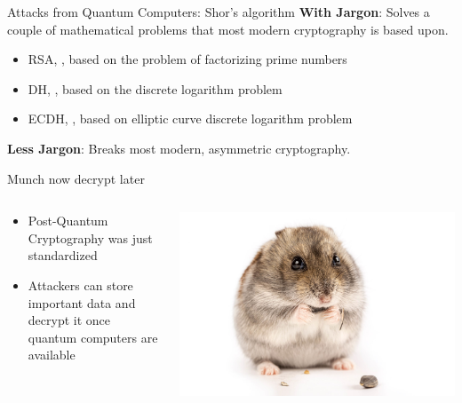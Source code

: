 \begin{frame}{Attacks from Quantum Computers: Shor's algorithm}
  \textbf{With Jargon}: Solves a couple of mathematical problems that most modern cryptography is based upon.
  \vfill
  \begin{itemize}
      \item RSA, , based on the problem of factorizing prime numbers
      \item DH, , based on the discrete logarithm problem
      \item ECDH, , based on elliptic curve discrete logarithm problem
  \end{itemize}
  \vfill
  \textbf{Less Jargon}: Breaks most modern, asymmetric cryptography.
\end{frame}

\begin{frame}{Munch now decrypt later}
  \begin{columns}[c]
    \begin{column}{.6\textwidth}
      \begin{itemize}
        \item Post-Quantum Cryptography was just standardized \citeMlkem
        \item Attackers can store important data and decrypt it once quantum computers are available
      \end{itemize}
    \end{column}

    \begin{column}{.4\textwidth}
      \includegraphics[height=.5\textheight]{graphics/gray-hamster-eating-sunflower-seed.jpeg}
    \end{column}
  \end{columns}
\end{frame}

